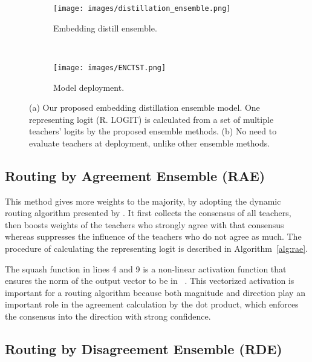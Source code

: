 \documentclass{article}
\begin{document}
\vspace{-1ex}
\begin{figure}[htbp!]
	\centering
	\begin{subfigure}[b]{0.25\textwidth}
		\centering
\texttt{[image: images/distillation\_ensemble.png]}
		\caption{Embedding distill ensemble.}
		\label{fig:distill-ensemble}
	\end{subfigure}~ 
	\begin{subfigure}[b]{0.23\textwidth}
		\centering
\texttt{[image: images/ENCTST.png]}
		\caption{Model deployment.}
		\label{fig:distill-ensemble-deploy}
	\end{subfigure}\caption{(a) Our proposed embedding distillation ensemble model. One representing logit (R. LOGIT) is calculated from a set of multiple teachers' logits by the proposed ensemble methods.
		(b) No need to evaluate teachers at deployment, unlike other ensemble methods.}
	\label{fig:distill-ensemble}
	\vspace{-4ex}
\end{figure}










\subsection{Routing by Agreement Ensemble (RAE)}
\label{sssec:rae-ensemble}

This method gives more weights to the majority, by adopting the dynamic routing algorithm presented by \cite{sabour2017dynamic}.
It first collects the consensus of all teachers, then boosts weights of the teachers who strongly agree with that consensus
whereas suppresses the influence of the teachers who do not agree as much.
The procedure of calculating the representing logit is described in Algorithm~\ref{alg:rae}.

The squash function in lines 4 and 9 is a non-linear activation function that ensures the norm of the output vector to be in ~\cite{sabour2017dynamic}.
This vectorized activation is important for a routing algorithm because both magnitude and direction play an important role in the agreement calculation by the dot product, which enforces the consensus into the direction with strong confidence.



\subsection{\fontsize{10.5pt}{12.6pt}\selectfont Routing by Disagreement Ensemble (RDE)}
\label{sssec:rde-ensemble}
\end{document}
